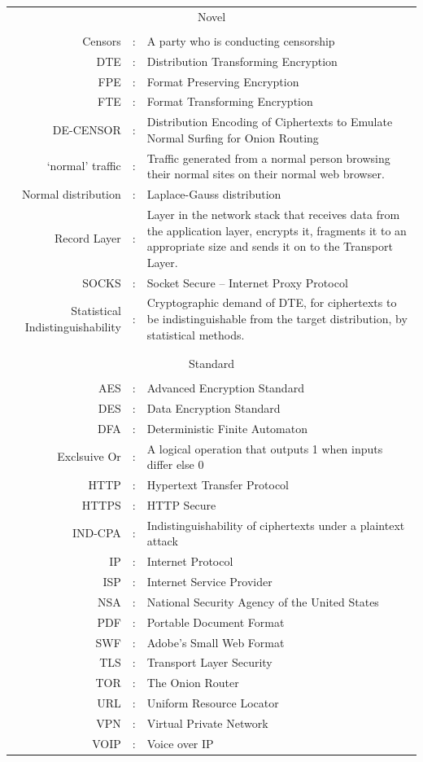 \documentclass[ %
                    author={Samuel Russell},
                supervisor={Prof. Bogdan Warinschi},
                    degree={MEng},
                     title={Innocuous Ciphertexts},
                  subtitle={The DE-CENSOR Scheme},
                      type={research},
                      year={2018} ]{dissertation}
\begin{document}
\begin{tabularx}{\textwidth}{ r c X }

\multicolumn{3}{c}{Novel}\\
&&\\
Censors				&:		& A party who is conducting censorship\\
DTE					&:		& Distribution Transforming Encryption\\
FPE					&:		& Format Preserving Encryption\\
FTE					&:		& Format Transforming Encryption\\
DE-CENSOR			&:		& Distribution Encoding of Ciphertexts to Emulate Normal Surfing for Onion Routing\\
`normal' traffic		&:		& Traffic generated from a normal person browsing their normal sites on their normal web browser.\\
Normal distribution &:		& Laplace-Gauss distribution\\
Record Layer		&:		& Layer in the network stack that receives data from the application layer, encrypts it, fragments it to an appropriate size and sends it on to the Transport Layer.\\
SOCKS				&:		& Socket Secure -- Internet Proxy Protocol\\
Statistical Indistinguishability&:& Cryptographic demand of DTE, for ciphertexts to be indistinguishable from the target distribution, by statistical methods.\\
&&\\
&&\\
\multicolumn{3}{c}{Standard}\\
&&\\
AES                 &:		& Advanced Encryption Standard\\
DES                 &:		& Data Encryption Standard\\
DFA					&:		& Deterministic Finite Automaton\\
Exclsuive Or		&:		& A logical operation that outputs 1 when inputs differ else 0\\
HTTP				&:		& Hypertext Transfer Protocol\\
HTTPS				&:		& HTTP Secure\\
IND-CPA				&:		& Indistinguishability of ciphertexts under a plaintext attack\\
IP					&:		& Internet Protocol\\
ISP					&:		& Internet Service Provider\\
NSA					&:		& National Security Agency of the United States\\
PDF					&:		& Portable Document Format\\
SWF					&:		& Adobe's Small Web Format\\
TLS					&:		& Transport Layer Security\\
TOR					&:		& The Onion Router\\
URL					&:		& Uniform Resource Locator\\
VPN					&:		& Virtual Private Network\\
VOIP				&:		& Voice over IP\\

\end{tabularx}
\end{document}
